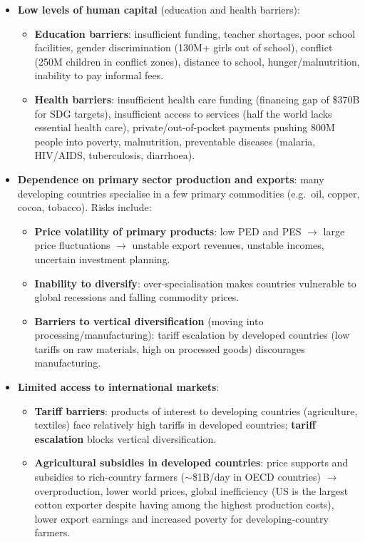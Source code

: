 \documentclass[a4paper,12pt]{article}
\begin{document}
\begin{itemize}
\begin{itemize}
  \end{itemize}
  \item \textbf{Low levels of human capital} (education and health barriers):
  \begin{itemize}
    \item \textbf{Education barriers}: insufficient funding, teacher shortages, poor school facilities, gender discrimination (130M+ girls out of school), conflict (250M children in conflict zones), distance to school, hunger/malnutrition, inability to pay informal fees.
    \item \textbf{Health barriers}: insufficient health care funding (financing gap of \$370B for SDG targets), insufficient access to services (half the world lacks essential health care), private/out-of-pocket payments pushing 800M people into poverty, malnutrition, preventable diseases (malaria, HIV/AIDS, tuberculosis, diarrhoea).
  \end{itemize}
  \item \textbf{Dependence on primary sector production and exports}: many developing countries specialise in a few primary commodities (e.g.\ oil, copper, cocoa, tobacco). Risks include:
  \begin{itemize}
    \item \textbf{Price volatility of primary products}: low PED and PES $\to$ large price fluctuations $\to$ unstable export revenues, unstable incomes, uncertain investment planning.
    \item \textbf{Inability to diversify}: over-specialisation makes countries vulnerable to global recessions and falling commodity prices.
    \item \textbf{Barriers to vertical diversification} (moving into processing/manufacturing): tariff escalation by developed countries (low tariffs on raw materials, high on processed goods) discourages manufacturing.
  \end{itemize}
  \item \textbf{Limited access to international markets}:
  \begin{itemize}
    \item \textbf{Tariff barriers}: products of interest to developing countries (agriculture, textiles) face relatively high tariffs in developed countries; \textbf{tariff escalation} blocks vertical diversification.
    \item \textbf{Agricultural subsidies in developed countries}: price supports and subsidies to rich-country farmers ($\sim$\$1B/day in OECD countries) $\to$ overproduction, lower world prices, global inefficiency (US is the largest cotton exporter despite having among the highest production costs), lower export earnings and increased poverty for developing-country farmers.

\end{itemize}
\end{itemize}
\end{document}
